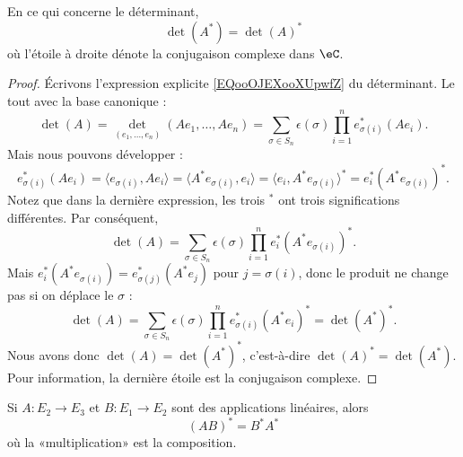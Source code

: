 \begin{proposition}     \label{PROPooSHZMooGwdfBd}
	En ce qui concerne le déterminant,
	\begin{equation}
		\det(A^*)=\det(A)^*
	\end{equation}
	où l'étoile à droite dénote la conjugaison complexe dans \( \eC\).
\end{proposition}

\begin{proof}
	Écrivons l'expression explicite \eqref{EQooOJEXooXUpwfZ} du déterminant. Le tout avec la base canonique :
	\begin{equation}
		\det(A)=\det_{(e_1,\ldots, e_n)}(Ae_1,\ldots, Ae_n)=\sum_{\sigma\in S_n}\epsilon(\sigma)\prod_{i=1}^ne_{\sigma(i)}^*(Ae_i).
	\end{equation}
	Mais nous pouvons développer :
	\begin{equation}
		e^*_{\sigma(i)}(Ae_i)=\langle e_{\sigma(i)}, Ae_i\rangle =\langle A^*e_{\sigma(i)}, e_i\rangle =\langle e_i, A^*e_{\sigma(i)}\rangle^*=e_i^*(A^*e_{\sigma(i)})^*.
	\end{equation}
	Notez que dans la dernière expression, les trois \( {}^*\) ont trois significations différentes. Par conséquent,
	\begin{equation}
		\det(A)=\sum_{\sigma\in S_n}\epsilon(\sigma)\prod_{i=1}^{n}e_i^*(A^*e_{\sigma(i)})^*.
	\end{equation}
	Mais \( e_i^*(A^*e_{\sigma(i)})=e_{\sigma(j)}^*(A^*e_{j})\) pour \( j=\sigma(i)\), donc le produit ne change pas si on déplace le \( \sigma\) :
	\begin{equation}
		\det(A)=\sum_{\sigma\in S_n}\epsilon(\sigma)\prod_{i=1}^{n}e_{\sigma(i)}^*(A^*e_{i})^*=\det(A^*)^*.
	\end{equation}
	Nous avons donc \( \det(A)=\det(A^*)^*\), c'est-à-dire \( \det(A)^*=\det(A^*)\). Pour information, la dernière étoile est la conjugaison complexe.
\end{proof}

\begin{proposition}     \label{PROPooVPSYooRuoEFi}
	Si \( A\colon E_2\to E_3\) et \( B\colon E_1\to E_2\) sont des applications linéaires, alors
	\begin{equation}
		(AB)^*=B^*A^*
	\end{equation}
	où la «multiplication» est la composition.
\end{proposition}

